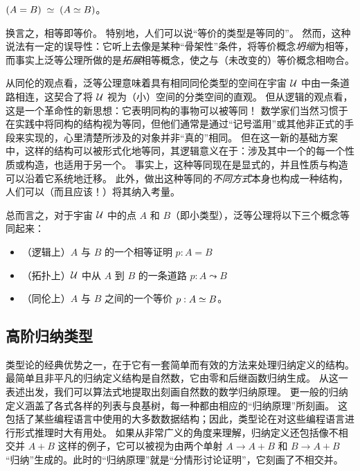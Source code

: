 \begin{description}%
\item[泛等公理：] $(A = B) \;\simeq\; (A \simeq B)$。
\end{description}

%
换言之，相等即等价。%
特别地，人们可以说``等价的类型是等同的''。
然而，这种说法有一定的误导性：它听上去像是某种``骨架性''条件，将等价概念\emph{坍缩}为相等，而事实上泛等公理所做的是\emph{拓展}相等概念，使之与（未改变的）等价概念相吻合。

从同伦的观点看，泛等公理意味着具有相同同伦类型的空间在宇宙 $\mathcal{U}$ 中由一条道路相连，这契合了将 $\mathcal{U}$ 视为（小）空间的分类空间的直观。
但从逻辑的观点看，这是一个革命性的新思想：它表明同构的事物可以被等同！
数学家们当然习惯于在实践中将同构的结构视为等同，但他们通常是通过``记号滥用''或其他非正式的手段来实现的，心里清楚所涉及的对象并非``真的''相同。
但在这一新的基础方案中，这样的结构可以被形式化地等同，其逻辑意义在于：涉及其中一个的每一个性质或构造，也适用于另一个。
事实上，这种等同现在是显式的，并且性质与构造可以沿着它系统地迁移。
此外，做出这种等同的\emph{不同方式}本身也构成一种结构，人们可以（而且应该！）将其纳入考量。

总而言之，对于宇宙 $\mathcal{U}$ 中的点 $A$ 和 $B$（即小类型），泛等公理将以下三个概念等同起来：

\begin{itemize}
\item（逻辑上）$A$ 与 $B$ 的一个相等证明 $p:A=B$
\item（拓扑上）$\mathcal{U}$ 中从 $A$ 到 $B$ 的一条道路 $p:A \leadsto B$
\item（同伦上）$A$ 与 $B$ 之间的一个等价 $p:A \simeq B$。
\end{itemize}

\subsection*{高阶归纳类型}%

类型论的经典优势之一，在于它有一套简单而有效的方法来处理归纳定义的结构。
最简单且非平凡的归纳定义结构是自然数，它由零和后继函数归纳生成。
从这一表述出发，我们可以算法式地提取出刻画自然数的数学归纳原理。
更一般的归纳定义涵盖了各式各样的列表与良基树，每一种都由相应的``归纳原理''所刻画。
这包括了某些编程语言中使用的大多数数据结构；因此，类型论在对这些编程语言进行形式推理时大有用处。
如果从非常广义的角度来理解，归纳定义还包括像不相交并 $A+B$ 这样的例子，它可以被视为由两个单射 $A\to A+B$ 和 $B\to A+B$ ``归纳''生成的。此时的``归纳原理''就是``分情形讨论证明''，它刻画了不相交并。

